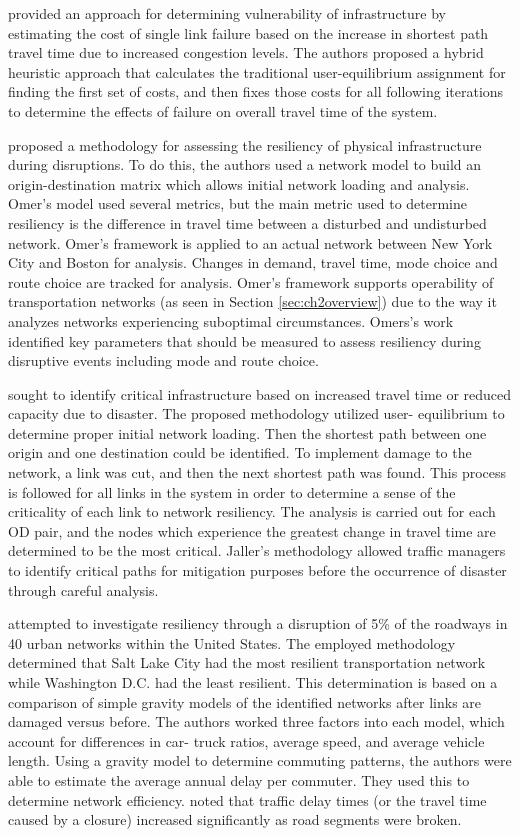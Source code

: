 \citet{ibrahim2011} provided an approach for determining
vulnerability of infrastructure by estimating the cost of single link
failure based on the increase in shortest path travel time due to
increased congestion
levels. The authors proposed a hybrid heuristic approach that calculates the
traditional user-equilibrium assignment for finding the first set of
costs, and
then fixes those costs for all following iterations to determine the
effects of
failure on overall travel time of the system.

\citet{omer2013} proposed a methodology for assessing the resiliency of
physical infrastructure
during disruptions. To do this, the authors used a network model to build
an origin-destination
matrix which allows initial network loading and analysis. Omer’s model used
several metrics, but
the main metric used to determine resiliency is the difference in travel
time between a disturbed
and undisturbed network. Omer’s framework is applied to an actual network
between New York City
and Boston for analysis. Changes in demand, travel time, mode choice and
route choice are tracked
for analysis. Omer’s framework supports operability of transportation
networks (as seen in Section \ref{sec:ch2overview}) due to the way it
analyzes networks experiencing suboptimal circumstances. Omers's work
identified key
parameters that should be measured to assess resiliency during disruptive
events including mode and route choice.

\citet{jaller2015} sought to identify critical infrastructure based on
increased travel time or
reduced capacity due to disaster. The proposed methodology utilized user-
equilibrium to determine
proper initial network loading. Then the shortest path between one origin
and one destination
could be identified. To implement damage to the network, a link was cut, and
then the next shortest
path was found. This process is followed for all links in the system in
order to determine a sense
of the criticality of each link to network resiliency. The analysis is
carried out for each OD
pair, and the nodes which experience the greatest change in travel time are determined to
be the most critical.
Jaller’s methodology allowed traffic managers to identify critical paths
for mitigation purposes
before the occurrence of disaster through careful analysis.

\citet{ganin2017} attempted to investigate resiliency through a disruption
of 5\% of the roadways
in 40 urban networks within the United States. The employed methodology
determined that Salt Lake
City had the most resilient transportation network while Washington D.C.
had the least resilient.
This determination is based on a comparison of simple gravity models of the identified networks after links are
damaged versus before.
The authors worked three factors into each model, which account for
differences in car-
truck ratios, average speed, and average vehicle length. Using a gravity
model to determine commuting patterns, the authors were
able to estimate the average
annual delay per commuter. They used this to determine network efficiency.
\citeauthor{ganin2017} noted that
traffic delay times (or the travel time caused by a closure) increased
significantly as road segments were broken.

